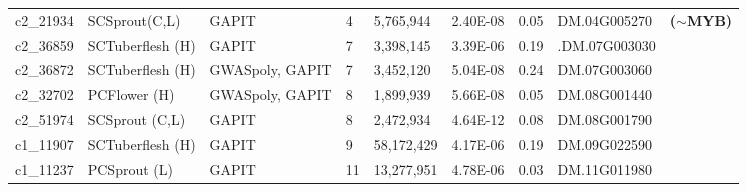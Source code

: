 \documentclass[pdflatex,sn-mathphys-ay]{sn-jnl}%
\begin{document}
\begin{landscape}
\begin{table}[ht]
\begin{tabular}{lllllllll}
\rowcolor[HTML]{FFFFD7} 
c2\_21934                        & SCSprout(C,L)                          & GAPIT                           & 4                        & 5,765,944                         & 2.40E-08                        & 0.05                        & DM.04G005270                        & \textbf{($\sim$MYB)}\citep{sharma2024genotyping,riveros2022uncovering}                      \\
c2\_36859                        & SCTuberflesh (H)                        & GAPIT                           & 7                        & 3,398,145                         & 3.39E-06                        & 0.19                        & .DM.07G003030                        &                                                                              \\
c2\_36872                        & SCTuberflesh (H)                        & GWASpoly, GAPIT                 & 7                        & 3,452,120                         & 5.04E-08                        & 0.24                        & DM.07G003060                        &                                                                              \\
c2\_32702                        & PCFlower (H)                            & GWASpoly, GAPIT                 & 8                        & 1,899,939                         & 5.66E-08                        & 0.05                        & DM.08G001440                        &                                                                              \\
c2\_51974                        & SCSprout (C,L)                          & GAPIT                           & 8                        & 2,472,934                         & 4.64E-12                        & 0.08                        & DM.08G001790                        &                                                                              \\
\rowcolor[HTML]{FFFFD7} 
c1\_11907                        & SCTuberflesh (H)                        & GAPIT                           & 9                        & 58,172,429                        & 4.17E-06                        & 0.19                        & DM.09G022590                        &   \citep{parra2021pathway}                                                                           \\
c1\_11237                        & PCSprout (L)                            & GAPIT                           & 11                       & 13,277,951                        & 4.78E-06                        & 0.03                        & DM.11G011980                        &                                                                              \\

\end{tabular}
\end{table}
\end{landscape}
\end{document}
